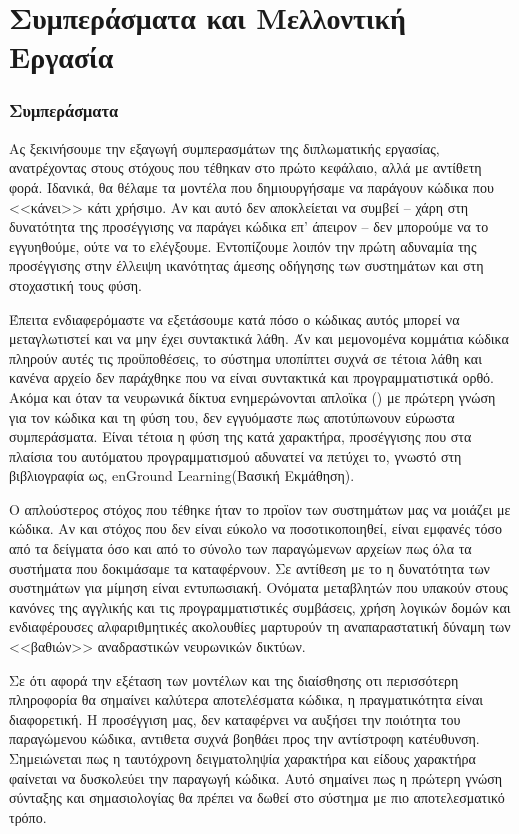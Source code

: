 \chapter{Συμπεράσματα και Μελλοντική Εργασία}

\subsection{Συμπεράσματα}

Ας ξεκινήσουμε την εξαγωγή συμπερασμάτων της διπλωματικής εργασίας, ανατρέχοντας στους στόχους που τέθηκαν στο πρώτο κεφάλαιο, αλλά με αντίθετη φορά.
Ιδανικά, θα θέλαμε τα μοντέλα που δημιουργήσαμε να παράγουν κώδικα που <<κάνει>> κάτι χρήσιμο. Αν και αυτό δεν αποκλείεται να συμβεί -- χάρη στη δυνατότητα της προσέγγισης να παράγει κώδικα  επ' άπειρον -- δεν μπορούμε να το εγγυηθούμε, ούτε να το ελέγξουμε.
Εντοπίζουμε λοιπόν την πρώτη αδυναμία της προσέγγισης στην έλλειψη ικανότητας άμεσης οδήγησης των συστημάτων και στη στοχαστική τους φύση.

Έπειτα ενδιαφερόμαστε να εξετάσουμε κατά πόσο ο κώδικας αυτός μπορεί να μεταγλωτιστεί και να μην έχει συντακτικά λάθη.
Άν και μεμονομένα κομμάτια κώδικα πληρούν αυτές τις προϋποθέσεις, το σύστημα υποπίπτει συχνά σε τέτοια λάθη και κανένα αρχείο δεν παράχθηκε που να είναι συντακτικά και προγραμματιστικά ορθό. 
Ακόμα και όταν τα νευρωνικά δίκτυα ενημερώνονται απλοϊκα () με πρώτερη γνώση για τον κώδικα και τη φύση του, δεν εγγυόμαστε πως αποτύπωνουν εύρωστα συμπεράσματα.
Είναι τέτοια η φύση της κατά χαρακτήρα,  προσέγγισης που στα πλαίσια του αυτόματου προγραμματισμού αδυνατεί να πετύχει το, γνωστό στη βιβλιογραφία ως, en{Ground Learning}(Βασική Εκμάθηση).

Ο απλούστερος στόχος που τέθηκε ήταν το προϊον των συστημάτων μας να μοιάζει με κώδικα. Αν και στόχος που δεν είναι εύκολο να ποσοτικοποιηθεί, είναι εμφανές τόσο από τα δείγματα όσο και από το σύνολο των παραγώμενων αρχείων πως όλα τα συστήματα που δοκιμάσαμε τα καταφέρνουν. 
Σε αντίθεση με το  η δυνατότητα των συστημάτων για μίμηση είναι εντυπωσιακή.
Ονόματα μεταβλητών που υπακούν στους κανόνες της αγγλικής και τις προγραμματιστικές συμβάσεις, χρήση λογικών δομών και ενδιαφέρουσες αλφαριθμητικές ακολουθίες μαρτυρούν τη αναπαραστατική δύναμη των <<βαθιών>> αναδραστικών νευρωνικών δικτύων.

Σε ότι αφορά την εξέταση των  μοντέλων και της διαίσθησης οτι περισσότερη πληροφορία θα σημαίνει καλύτερα αποτελέσματα κώδικα, η πραγματικότητα είναι διαφορετική.
Η προσέγγιση μας, δεν καταφέρνει να αυξήσει την ποιότητα του παραγώμενου κώδικα, αντιθετα συχνά βοηθάει προς την αντίστροφη κατέυθυνση.
Σημειώνεται πως η ταυτόχρονη δειγματοληψία χαρακτήρα και είδους χαρακτήρα φαίνεται να δυσκολεύει την παραγωγή κώδικα.
Αυτό σημαίνει πως η πρώτερη γνώση σύνταξης και σημασιολογίας  θα πρέπει να δωθεί στο σύστημα με πιο αποτελεσματικό τρόπο.

